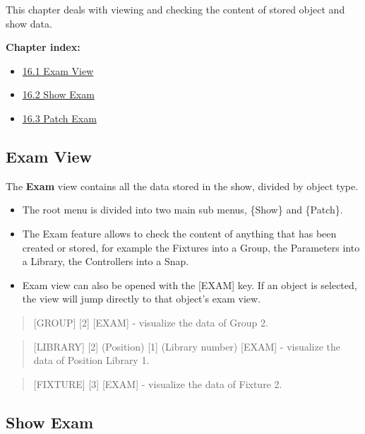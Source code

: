 \documentclass[
]{article}
\providecommand{\tightlist}{%
  \setlength{\itemsep}{0pt}\setlength{\parskip}{0pt}}
\begin{document}
This chapter deals with viewing and checking the content of stored object and show data.

\textbf{Chapter index:}

\begin{itemize}
\tightlist
\item
  \protect\hyperlink{Exam-View-16.1}{16.1 Exam View}
\item
  \protect\hyperlink{Show-Exam-16.2}{16.2 Show Exam}
\item
  \protect\hyperlink{Patch-Exam-16.3}{16.3 Patch Exam}
\end{itemize}

\hypertarget{Exam-View-16.1}{%
\subsection{Exam View}\label{Exam-View-16.1}}

The \textbf{Exam} view contains all the data stored in the show, divided by object type.

\begin{itemize}
\item
  The root menu is divided into two main sub menus, \{Show\} and \{Patch\}.
\item
  The Exam feature allows to check the content of anything that has been created or stored, for example the Fixtures into a Group, the Parameters into a Library, the Controllers into a Snap.
\item
  Exam view can also be opened with the {[}EXAM{]} key. If an object is selected, the view will jump directly to that object's exam view.
\end{itemize}

\begin{quote}
{[}GROUP{]} {[}2{]} {[}EXAM{]} - visualize the data of Group 2.
\end{quote}

\begin{quote}
{[}LIBRARY{]} {[}2{]} (Position) {[}1{]} (Library number) {[}EXAM{]} - visualize the data of Position Library 1.
\end{quote}

\begin{quote}
{[}FIXTURE{]} {[}3{]} {[}EXAM{]} - visualize the data of Fixture 2.
\end{quote}

\hypertarget{Show-Exam-16.2}{%
\subsection{Show Exam}\label{Show-Exam-16.2}}
\end{document}
